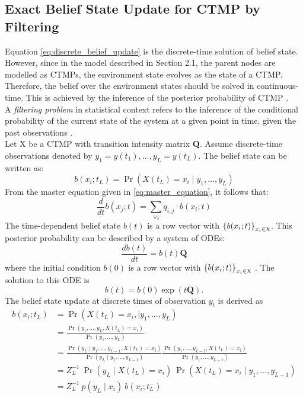 \subsection{Exact Belief State Update for CTMP by Filtering}
\label{sec:filtering_CTMC}
Equation \ref{eq:discrete_belief_update} is the discrete-time solution of belief state. However, since in the model described in Section 2.1, the parent nodes are modelled as CTMPs, the environment state evolves as the state of a CTMP. Therefore, the belief over the environment states should be solved in continuous-time. This is achieved by the inference of the posterior probability of CTMP \cite{article}.\\
A \textit{filtering problem} in statistical context refers to the inference of the conditional probability of the current state of the system at a given point in time, given the past observations \cite{Godsill2019}.\\
Let X be a CTMP with transition intensity matrix \textbf{Q}. Assume discrete-time observations denoted by $ y_{1}=y(t_{1}), ..., y_{L}=y(t_{L}) $. The belief state can be written as:
\begin{equation}
b(x_{i};t_{L}) = \operatorname{Pr}(X(t_{L}) = x_{i} \mid y_{1}, ..., y_{L})
\end{equation}
From the master equation given in \autoref{eq:master_equation}, it follows that:
\begin{equation}
\frac{d}{dt} b(x_{j};t)  = \sum_{\forall i} q_{i,j} \cdot b(x_{i};t)
\end{equation}
The time-dependent belief state $ b(t) $ is a row vector with $ \left\lbrace b(x_{i};t)\right\rbrace_{x_{i} \in \rchi}  $.
This posterior probability can be described by a system of ODEs:
\begin{equation}
\frac{db(t)}{dt} = b(t)\textbf{Q}
\end{equation}
where the initial condition $ b(0) $ is a row vector with $ \left\lbrace b(x_{i};t)\right\rbrace_{x_{i} \in \rchi} $ \cite{article}. The solution to this ODE is
\begin{equation}
b(t) = b(0) \exp(t\textbf{Q}).
\label{eq:b_cont}
\end{equation}
The belief state update at discrete times of observation $ y_{t} $ is derived as 
\begin{align}
b(x_{i}; t_{L}) & = \operatorname{Pr}( X(t_{L}) = x_{i},\mid y_{1}, ..., y_{L}) \nonumber\\ & = \frac{\operatorname{Pr}(y_{1}, ..., y_{L}, X(t_{L}) = x_{i})}{\operatorname{Pr}(y_{1}, ..., y_{L})}  \nonumber\\ & = \frac{\operatorname{Pr}(y_{L} \mid y_{1}, ..., y_{L-1}, X(t_{L}) = x_{i})}{\operatorname{Pr}(y_{L} \mid y_{1}, ..., y_{L-1})} \frac{\operatorname{Pr}(y_{1}, ..., y_{L-1}, X(t_{L}) = x_{i})}{\operatorname{Pr}(y_{1}, ..., y_{L-1})}  \nonumber\\ & = Z_{L}^{-1} \ \operatorname{Pr}(y_{L} \mid X(t_{L})=x_{i})\ \operatorname{Pr}( X(t_{L}) = x_{i}\mid y_{1}, ..., y_{L-1})  \nonumber\\ & = Z_{L}^{-1}\ {p(y_{L} \mid x_{i})}\ {b(x_{i}; t_{L}^{-})}
\label{eq:b_jump}
\end{align}
